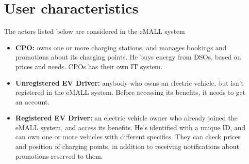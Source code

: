 \section{User characteristics}
\label{sec:user_characteristics}%
The actors listed below are considered in the eMALL system
\begin{itemize}
    \item \textbf{CPO:} owns one or more charging stations, and manages bookings and promotions about its charging points.
    He buys energy from DSOs, based on prices and needs.
    CPOs has their own IT system.
    \item \textbf{Unregistered EV Driver:} anybody who owns an electric vehicle, but isn’t registered in the eMALL system.
    Before accessing its benefits, it needs to get an account.
    \item \textbf{Registered EV Driver:} an electric vehicle owner who already joined the eMALL system, and access its benefits.
    He’s identified with a unique ID, and can own one or more vehicles with different specifics.
    They can check prices and position of charging points, in addition to receiving notifications about promotions reserved to them.
\end{itemize}


